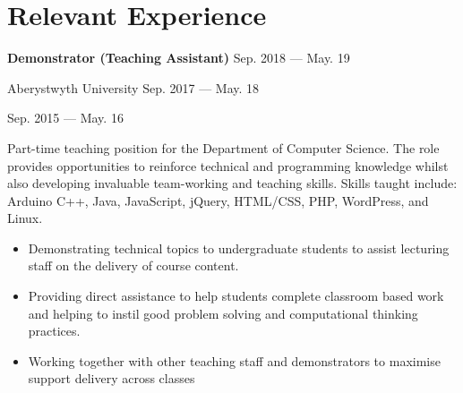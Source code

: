 \section{Relevant Experience}

\parbox[t][][t]{\linewidth}{
	\parbox{\linewidth}{{\textbf{Demonstrator (Teaching Assistant)}
		\hfill {{Sep. 2018 --- May. 19}}}}
	\parbox{\linewidth}{{Aberystwyth University
		\hfill {{Sep. 2017 --- May. 18}}}}
		\parbox{\linewidth}{{
			\hfill {{Sep. 2015 --- May. 16}}}}
	\smallbreak
	
	\bigskip
	Part-time teaching position for the Department of Computer Science. The role provides opportunities to reinforce technical and programming knowledge
	whilst also developing invaluable team-working and teaching skills. Skills taught include: Arduino C++, Java, JavaScript, jQuery, HTML/CSS, PHP, WordPress, and Linux.
			
	\bigskip
	\begin{itemize}
		\item{Demonstrating technical topics to undergraduate students to assist lecturing staff on the delivery of course content.}\\[-.6em]
		\item{Providing direct assistance to help students complete classroom based work and helping to instil good problem solving and computational thinking practices.}\\[-.6em]
		\item{Working together with other teaching staff and demonstrators to maximise support delivery across classes}\\[-.6em]
	\end{itemize}
	\bigskip
	\bigskip
}

